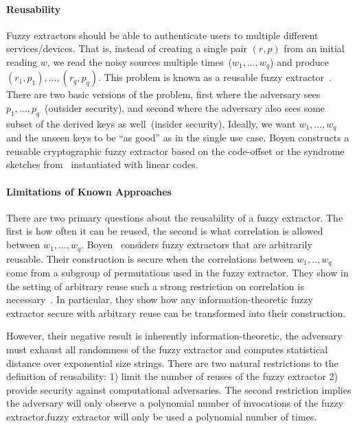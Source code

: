 \documentclass[11pt]{article}
\begin{document}
\paragraph{Reusability} Fuzzy extractors should be able to authenticate users to multiple different services/devices.  That is, instead of creating a single pair $(r, p)$ from an initial reading $w$, we read the noisy sources multiple times~($w_1,..., w_q$) and produce $(r_1, p_1),..., (r_q, p_q)$.  This problem is known as a reusable fuzzy extractor~\cite{Boyen2004}.  There are two basic versions of the problem, first where the adversary sees $p_1,..., p_q$~(outsider security), and second where the adversary also sees some subset of the derived keys as well~(insider security).  Ideally, we want $w_1,..., w_q$ and the unseen keys to be ``as good'' as in the single use case.  Boyen constructs a reusable cryptographic fuzzy extractor based on the code-offset or the syndrome sketches from~\cite{JW99, DBLP:journals/siamcomp/DodisORS08} instantiated with linear codes.

\paragraph{Limitations of Known Approaches}

There are two primary questions about the reusability of a fuzzy extractor.  The first is how often it can be reused, the second is what correlation is allowed between $w_1,..., w_q$.  Boyen~\cite{Boyen2004} considers fuzzy extractors that are arbitrarily reusable.  Their construction is secure when the correlations between $w_1,.., w_q$ come from a subgroup of permutations used in the fuzzy extractor.  They show in the setting of arbitrary reuse such a strong restriction on correlation is necessary~\cite[Theorem 11]{Boyen2004}.  In particular, they show how any information-theoretic fuzzy extractor secure with arbitrary reuse can be transformed into their construction.  

However, their negative result is inherently information-theoretic, the adversary must exhaust all randomness of the fuzzy extractor and computes statistical distance over exponential size strings.  There are two natural restrictions to the definition of reusability: 1) limit the number of reuses of the fuzzy extractor 2) provide security against computational adversaries.  The second restriction implies the adversary will only observe a polynomial number of invocations of the fuzzy extractor.fuzzy extractor will only be used a polynomial number of times.
\end{document}
